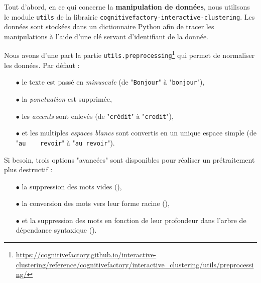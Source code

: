 		Tout d'abord, en ce qui concerne la \textbf{manipulation de données}, nous utilisons le module \texttt{utils} de la librairie \texttt{cognitivefactory-interactive-clustering}.
		Les données sont stockées dans un dictionnaire Python afin de tracer les manipulations à l'aide d'une clé servant d'identifiant de la donnée.
		
		Nous avons d'une part la partie \texttt{utils.preprocessing}\footnote{\url{https://cognitivefactory.github.io/interactive-clustering/reference/cognitivefactory/interactive_clustering/utils/preprocessing/}} qui permet de normaliser les données.
		Par défaut :
		\begin{itemize}
			\item[\(\bullet\)] le texte est passé en \textit{minuscule} (de "\texttt{Bonjour}" à "\texttt{bonjour}"),
			\item[\(\bullet\)] la \textit{ponctuation} est supprimée, %
			\item[\(\bullet\)] les \textit{accents} sont enlevés (de "\texttt{crédit}" à "\texttt{credit}"),
			\item[\(\bullet\)] et les multiples \textit{espaces blancs} sont convertis en un unique espace simple (de "\texttt{au~~~~revoir}" à "\texttt{au revoir}").
		\end{itemize}
		
		Si besoin, trois options "avancées" sont disponibles pour réaliser un prétraitement plus destructif :
		\begin{itemize}
			\item[\(\bullet\)] la suppression des mots vides (\cite{nothman-etal:2018:stop-word-lists}),
			\item[\(\bullet\)] la conversion des mots vers leur forme racine (\cite{manning-schutze:2000:foundations-statistical-natural}),
			\item[\(\bullet\)] et la suppression des mots en fonction de leur profondeur dans l'arbre de dépendance syntaxique (\cite{nivre:2006:inductive-dependency-parsing}).
		\end{itemize}
		
